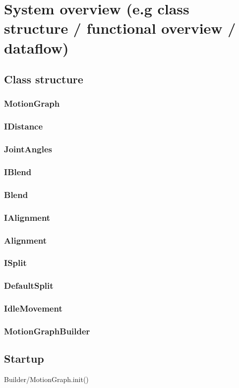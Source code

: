 \documentclass[a4paper,10pt]{scrartcl}
\let\stdsubsection\subsection
\renewcommand\subsection{\nopagebreak\stdsubsection}
\begin{document}
\section{System overview (e.g class structure / functional overview / dataflow)}

\subsection{Class structure}
\subsubsection{MotionGraph}
\subsubsection{IDistance}
\subsubsection{JointAngles}
\subsubsection{IBlend}
\subsubsection{Blend}
\subsubsection{IAlignment}
\subsubsection{Alignment}
\subsubsection{ISplit}
\subsubsection{DefaultSplit}
\subsubsection{IdleMovement}
\subsubsection{MotionGraphBuilder}


\subsection{Startup}
Builder/MotionGraph.init()
\end{document}
